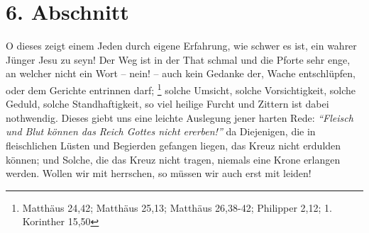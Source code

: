 \section{6. Abschnitt} \label{kap3_ab6} 

O dieses zeigt einem Jeden durch eigene Erfahrung, wie schwer es ist, ein wahrer
Jünger Jesu zu seyn! Der Weg ist in der That schmal und die Pforte sehr enge, an
welcher nicht ein Wort -- nein! -- auch kein Gedanke der, Wache entschlüpfen, oder
dem Gerichte entrinnen darf;
\footnote{Matthäus 24,42; Matthäus 25,13; Matthäus 26,38-42;
Philipper 2,12; 1. Korinther 15,50}
solche Umsicht, solche Vorsichtigkeit, solche Geduld,
solche Standhaftigkeit, so viel heilige Furcht und Zittern ist dabei nothwendig.
Dieses giebt uns eine leichte Auslegung jener harten Rede:
\textit{"`Fleisch und Blut können das Reich Gottes nicht ererben!"'}
da Diejenigen, die in fleischlichen
Lüsten und Begierden gefangen liegen, das Kreuz nicht erdulden können; und
Solche, die das Kreuz nicht tragen, niemals eine Krone erlangen werden. Wollen
wir mit herrschen, so müssen wir auch erst mit leiden!

